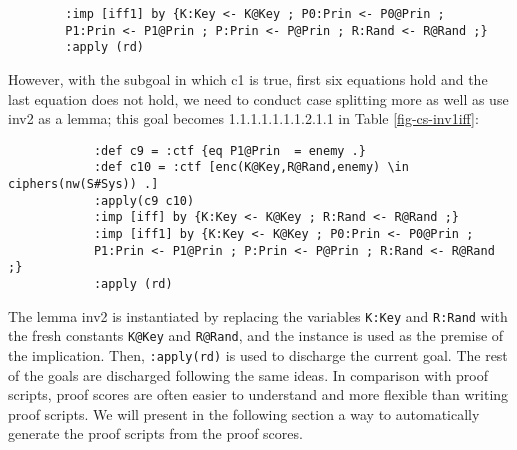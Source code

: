 \documentclass[a4paper,fleqn]{cas-dc}
\begin{document}
	\begin{verbatim}
		:imp [iff1] by {K:Key <- K@Key ; P0:Prin <- P0@Prin ;
		P1:Prin <- P1@Prin ; P:Prin <- P@Prin ; R:Rand <- R@Rand ;}
		:apply (rd)
		\end{verbatim}
However, with the subgoal in which c1 is true, first six equations hold and the last equation does not hold, we need to conduct case splitting more as well as use inv2 as a lemma; this goal becomes 1.1.1.1.1.1.1.2.1.1 in Table \ref{fig-cs-inv1iff}:
	\begin{small}
		\begin{verbatim}
			:def c9 = :ctf {eq P1@Prin  = enemy .}
			:def c10 = :ctf [enc(K@Key,R@Rand,enemy) \in ciphers(nw(S#Sys)) .]
			:apply(c9 c10)
			:imp [iff] by {K:Key <- K@Key ; R:Rand <- R@Rand ;}
			:imp [iff1] by {K:Key <- K@Key ; P0:Prin <- P0@Prin ;
			P1:Prin <- P1@Prin ; P:Prin <- P@Prin ; R:Rand <- R@Rand ;}
			:apply (rd)
		\end{verbatim}
	\end{small}
	\noindent
The lemma inv2 is instantiated by replacing the variables
\verb!K:Key! and \verb!R:Rand! with the fresh constants \verb!K@Key! and \verb!R@Rand!, and the instance is used as the premise of the implication. Then, \verb!:apply(rd)! is used to discharge the current goal. The rest of the goals are discharged following the same ideas.
In comparison with proof scripts, proof scores are often easier to understand and more flexible than writing proof scripts. 
We will present in the following section a way to automatically generate the proof scripts from the proof scores.	
\end{document}
